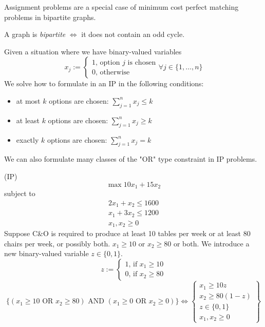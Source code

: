 Assignment problems are a special case of minimum cost perfect matching problems
in bipartite graphs.
\begin{remark}
    A graph is \emph{bipartite} $\iff$ it does not contain an odd cycle.
\end{remark}
Given a situation where we have binary-valued variables
\[x_j:=
    \begin{cases}
        1 \text{, option $j$ is chosen} \\
        0 \text{, otherwise}
    \end{cases}
    \forall j\in\{1,\dots,n\}
\]
We solve how to formulate in an IP in the following conditions:
\begin{itemize}
    \item at most $k$ options are chosen: $\displaystyle\sum\limits_{j=1}^n x_j\leqslant k$
    \item at least $k$ options are chosen: $\displaystyle\sum\limits_{j=1}^n x_j\geqslant  k$
    \item exactly $k$ options are chosen: $\displaystyle\sum\limits_{j=1}^n x_j=k$
\end{itemize}
We can also formulate many classes of the "OR" type constraint in IP problems.
\begin{exbox}
    \begin{example}[Refer to 1.1]
        (IP)
        \[\max 10x_1 + 15x_2\]
        subject to
        \begin{align*}
            2x_1 + x_2 \leqslant 1600 \\
            x_1 + 3x_2 \leqslant 1200 \\
            x_1, x_2 \geqslant  0
        \end{align*}
        Suppose C\&O is required to produce at least 10 tables per week or at least 80
        chairs per week, or possibly both. $x_1\geqslant  10$ or $x_2\geqslant  80$ or both. We
        introduce a new binary-valued variable $z\in\{0,1\}$.
        \[
            z:=
            \begin{cases}
                1 \text{, if } x_1\geqslant  10 \\
                0 \text{, if } x_2\geqslant  80
            \end{cases}
        \]
        \[
            \{(x_1\geqslant  10 \text{ OR } x_2\geqslant  80) \text{ AND }
            (x_1\geqslant  0 \text{ OR } x_2\geqslant  0)\}
            \iff
            \left\{\begin{array}{r}
                x_1\geqslant  10z     \\
                x_2\geqslant  80(1-z) \\
                z\in\{0,1\}           \\
                x_1,x_2\geqslant  0
            \end{array}\right\}
        \]
    \end{example}
\end{exbox}

